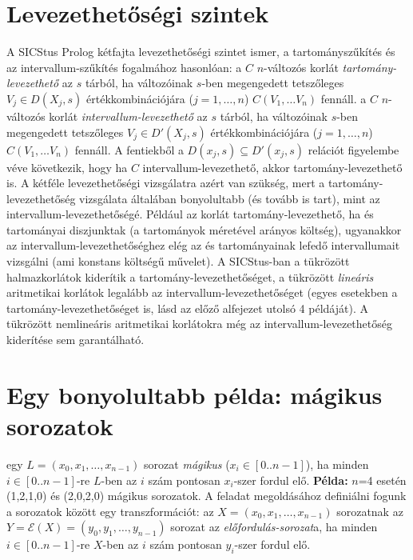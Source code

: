 \section{Levezethetőségi szintek}

\label{levezethetoseg}

A SICStus Prolog kétfajta levezethetőségi szintet ismer, a tartományszűkítés
és az intervallum-szűkítés fogalmához hasonlóan:
\br
{} a $C$ $n$-változós korlát \emph{tartomány-levezethető} az $s$ tárból,
ha változóinak $s$-ben megengedett tetszőleges $V_j \in D(X_j,s)$ értékkombinációjára
($j = 1, \ldots, n$) $C(V_1, \ldots V_n)$ fennáll.
\br
{} a $C$ $n$-változós korlát \emph{intervallum-levezethető} az $s$ tárból,
ha változóinak $s$-ben megengedett tetszőleges $V_j \in D'(X_j,s)$ értékkombinációjára
($j = 1, \ldots, n$) $C(V_1, \ldots V_n)$ fennáll.
\br
A fentiekből a $D(x_j,s) \subseteq D'(x_j,s)$ relációt figyelembe véve következik, hogy
ha $C$ intervallum-levezethető, akkor tartomány-levezethető is. A kétféle levezethetőségi
vizsgálatra azért van szükség, mert a tartomány-levezethetőség vizsgálata általában
bonyolultabb (és tovább is tart), mint az intervallum-levezethetőségé. Például az
 korlát tartomány-levezethető, ha  és  tartományai
diszjunktak (a tartományok méretével arányos költség), ugyanakkor az
intervallum-levezethetőséghez elég az  és  tartományainak lefedő
intervallumait vizsgálni (ami konstans költségű művelet).
\br
A SICStus-ban a tükrözött halmazkorlátok kiderítik a tartomány-levezethetőséget, a
tükrözött \emph{lineáris} aritmetikai korlátok legalább az intervallum-levezethetőséget
(egyes esetekben a tartomány-levezethetőséget is, lásd az előző alfejezet utolsó 4
példáját). A tükrözött nemlineáris aritmetikai korlátokra még az intervallum-levezethetőség
kiderítése sem garantálható.

\section{Egy bonyolultabb \clpfd példa: mágikus sorozatok}

 egy $L = (x_{0}, x_{1}, \ldots, x_{n-1})$ sorozat \emph{mágikus}
($x_{i} \in [0..n-1]$), ha minden $i \in [0..n-1]$-re $L$-ben az $i$ szám pontosan
$x_{i}$-szer fordul elő.
\br
{\bf Példa:} $n$=4 esetén (1,2,1,0) és (2,0,2,0) mágikus sorozatok.
\br
A feladat \clpfd megoldásához definiálni fogunk a sorozatok között egy transzformációt:
\br
{} az $X = (x_{0}, x_{1}, \ldots, x_{n-1})$ sorozatnak az
$Y = \mathcal{E}(X) = (y_{0}, y_{1}, \ldots, y_{n-1})$ sorozat az
\emph{előfordulás-sorozat}a, ha minden $i \in [0..n-1]$-re $X$-ben az $i$ szám
pontosan $y_{i}$-szer fordul elő.

